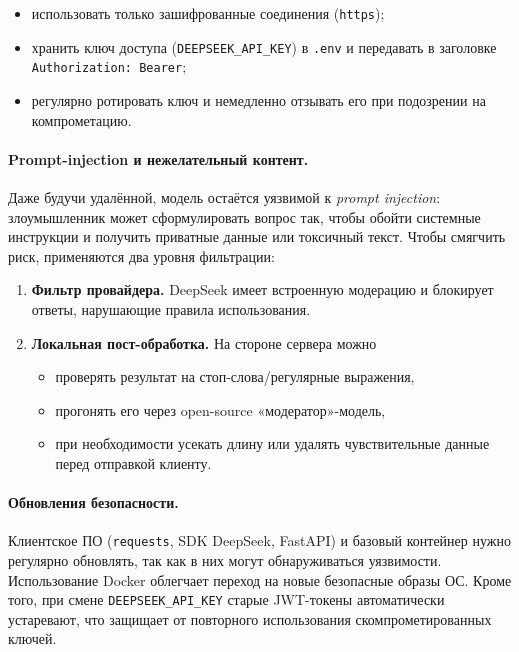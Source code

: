 \begin{itemize}
  \item использовать только зашифрованные соединения (\texttt{https});
  \item хранить ключ доступа (\texttt{DEEPSEEK\_API\_KEY}) в \texttt{.env} и передавать в заголовке \texttt{Authorization: Bearer};
  \item регулярно ротировать ключ и немедленно отзывать его при подозрении на компрометацию.
\end{itemize}

\paragraph{Prompt-injection и нежелательный контент.}
Даже будучи удалённой, модель остаётся уязвимой к \emph{prompt injection}: злоумышленник может сформулировать
вопрос так, чтобы обойти системные инструкции и получить приватные данные или токсичный текст.
Чтобы смягчить риск, применяются два уровня фильтрации:

\begin{enumerate}[label=\arabic*]
  \item \textbf{Фильтр провайдера.} DeepSeek имеет встроенную модерацию и блокирует ответы, нарушающие правила использования.
  \item \textbf{Локальная пост-обработка.}  На стороне сервера можно
        \begin{itemize}
          \item проверять результат на стоп-слова/регулярные выражения,
          \item прогонять его через open-source «модератор»-модель,
          \item при необходимости усекать длину или удалять чувствительные данные перед отправкой клиенту.
        \end{itemize}
\end{enumerate}

\paragraph{Обновления безопасности.}
Клиентское ПО (\texttt{requests}, SDK DeepSeek, FastAPI) и базовый контейнер
нужно регулярно обновлять, так как в них могут обнаруживаться уязвимости.
Использование Docker облегчает переход на новые безопасные образы ОС.
Кроме того, при смене \texttt{DEEPSEEK\_API\_KEY} старые JWT-токены автоматически устаревают,
что защищает от повторного использования скомпрометированных ключей.

